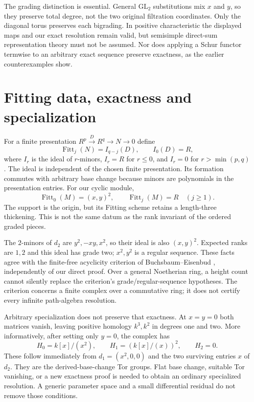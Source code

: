 \documentclass[11pt,oneside,openany]{book}
\theoremstyle{definition}\newtheorem{definition}[theorem]{Definition}
\theoremstyle{remark}\newtheorem{remark}[theorem]{Remark}
\begin{document}
The grading distinction is essential. General $\mathrm{GL}_2$ substitutions
mix $x$ and $y$, so they preserve total degree, not the two original
filtration coordinates. Only the diagonal torus preserves each bigrading.
In positive characteristic the displayed maps and our exact resolution
remain valid, but semisimple direct-sum representation theory must not
be assumed. Nor does applying a Schur functor termwise to an arbitrary
exact sequence preserve exactness, as the earlier counterexamples show.

\section{Fitting data, exactness and specialization}
For a finite presentation $R^p\xrightarrow D R^q\to N\to0$ define
\[
 \operatorname{Fitt}_j(N)=I_{q-j}(D),\qquad
 I_0(D)=R,
\]
where $I_r$ is the ideal of $r$-minors, $I_r=R$ for $r\le0$, and
$I_r=0$ for $r>\min(p,q)$. The ideal is independent of the chosen finite
presentation. Its formation commutes with arbitrary base change because
minors are polynomials in the presentation entries. For our cyclic module,
\[
 \operatorname{Fitt}_0(M)=(x,y)^2,\qquad
 \operatorname{Fitt}_j(M)=R\quad(j\ge1).
\]
The support is the origin, but its Fitting scheme retains a length-three
thickening. This is not the same datum as the rank invariant of the
ordered graded pieces.

The $2$-minors of $d_2$ are $y^2,-xy,x^2$, so their ideal is also
$(x,y)^2$. Expected ranks are $1,2$ and this ideal has grade two;
$x^2,y^2$ is a regular sequence. These facts agree with the finite-free
acyclicity criterion of Buchsbaum--Eisenbud \cite{PersBE}, independently
of our direct proof. Over a general Noetherian ring, a height count cannot
silently replace the criterion's grade/regular-sequence hypotheses.
The criterion concerns a finite complex over a commutative ring; it does
not certify every infinite path-algebra resolution.

Arbitrary specialization does not preserve that exactness. At $x=y=0$
both matrices vanish, leaving positive homology $k^3,k^2$ in degrees
one and two. More informatively, after setting only $y=0$, the complex
has
\[
 H_0=k[x]/(x^2),\qquad H_1=(k[x]/(x))^2,\qquad H_2=0.
\]
These follow immediately from $d_1=(x^2,0,0)$ and the two surviving
entries $x$ of $d_2$. They are the derived-base-change Tor groups.
Flat base change, suitable Tor vanishing, or a new exactness proof is
needed to obtain an ordinary specialized resolution. A generic parameter
space and a small differential residual do not remove those conditions.
\end{document}
